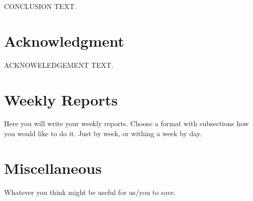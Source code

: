 \documentclass[aps,twocolumn]{revtex4}
\begin{document}
CONCLUSION TEXT.

\section{Acknowledgment}

ACKNOWELEDGEMENT TEXT.


%
%
%
%

%
%

	
 	

\appendix
	
\section{Weekly Reports}
\label{sec:Weekly Reports}
	
Here you will write your weekly reports. Choose a format with subsections how you would like to do it. Just by week, or withing a week by day.

\section{Miscellaneous}
\label{sec:Miscellaneous}

Whatever you think might be useful for us/you to save.
\end{document}
